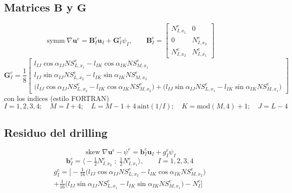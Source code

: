 \documentclass[11pt]{article}
\newcommand{\symm}{\operatorname{symm}}
\newcommand{\skewop}{\operatorname{skew}}
\begin{document}
\subsection{Matrices $\mathbf B$ y $\mathbf G$}
\begin{equation}
\symm\nabla\mathbf u^{e}=\mathbf B_{I}^{e}\mathbf u_{I}+\mathbf G_{I}^{e}\psi_{I},
\qquad
\mathbf B_{I}^{e}=\begin{bmatrix} N^{e}_{I,x_{1}} & 0\\ 0 & N^{e}_{I,x_{2}}\\ N^{e}_{I,x_{2}} & N^{e}_{I,x_{1}}\end{bmatrix}
\tag{26,27}
\end{equation}
\begin{equation}
\mathbf G_{I}^{e}=\frac18
\begin{bmatrix}
l_{IJ}\cos\alpha_{IJ}NS^{e}_{L,x_{1}}-l_{IK}\cos\alpha_{IK}NS^{e}_{M,x_{1}}\\[2pt]
l_{IJ}\sin\alpha_{IJ}NS^{e}_{L,x_{2}}-l_{IK}\sin\alpha_{IK}NS^{e}_{M,x_{2}}\\[2pt]
\big(l_{IJ}\cos\alpha_{IJ}NS^{e}_{L,x_{2}}-l_{IK}\cos\alpha_{IK}NS^{e}_{M,x_{2}}\big)
+\big(l_{IJ}\sin\alpha_{IJ}NS^{e}_{L,x_{1}}-l_{IK}\sin\alpha_{IK}NS^{e}_{M,x_{1}}\big)
\end{bmatrix}
\tag{28}
\end{equation}
con los indices (estilo FORTRAN)
\begin{equation}
I=1,2,3,4;\quad M=I+4;\quad L=M-1+4\,\mathrm{aint}(1/I);\quad K=\mathrm{mod}(M,4)+1;\quad J=L-4
\tag{29}
\end{equation}

\subsection{Residuo del drilling}
\begin{equation}
\skewop\nabla\mathbf u^{e}-\psi^{e}=\mathbf b_{I}^{e}\mathbf u_{I}+g_{I}^{e}\psi_{I}
\tag{30}
\end{equation}
\begin{equation}
\mathbf b_{I}^{e}=\big\langle -\tfrac12 N^{e}_{I,x_{2}}\;;\;\tfrac12 N^{e}_{I,x_{1}}\big\rangle,
\qquad I=1,2,3,4
\tag{31}
\end{equation}
\begin{multline}
g_{I}^{e}=\Big[-\tfrac{1}{16}\big(l_{IJ}\cos\alpha_{IJ}NS^{e}_{L,x_{2}}-l_{IK}\cos\alpha_{IK}NS^{e}_{M,x_{2}}\big)\\
+\tfrac{1}{16}\big(l_{IJ}\sin\alpha_{IJ}NS^{e}_{L,x_{1}}-l_{IK}\sin\alpha_{IK}NS^{e}_{M,x_{1}}\big)-N_{I}^{e}\Big]
\tag{32}
\end{multline}
\end{document}
